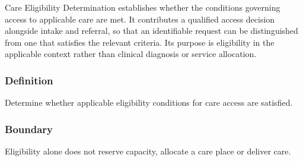 Care Eligibility Determination establishes whether the conditions governing access to applicable care are met. It contributes a qualified access decision alongside intake and referral, so that an identifiable request can be distinguished from one that satisfies the relevant criteria. Its purpose is eligibility in the applicable context rather than clinical diagnosis or service allocation.

\subsubsection*{Definition}

Determine whether applicable eligibility conditions for care access are satisfied.

\subsubsection*{Boundary}

Eligibility alone does not reserve capacity, allocate a care place or deliver care.

